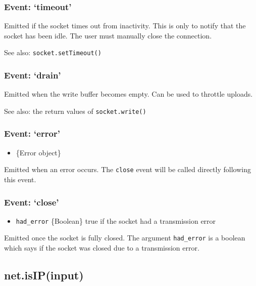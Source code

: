 \subsubsection{\texorpdfstring{Event:
`timeout'}{Event: timeout}}\label{event-timeout}

Emitted if the socket times out from inactivity. This is only to notify
that the socket has been idle. The user must manually close the
connection.

See also: \texttt{socket.setTimeout()}

\subsubsection{\texorpdfstring{Event:
`drain'}{Event: drain}}\label{event-drain}

Emitted when the write buffer becomes empty. Can be used to throttle
uploads.

See also: the return values of \texttt{socket.write()}

\subsubsection{\texorpdfstring{Event:
`error'}{Event: error}}\label{event-error-1}

\begin{itemize}
\itemsep1pt\parskip0pt
\item
  \{Error object\}
\end{itemize}

Emitted when an error occurs. The
\texttt{\textquotesingle{}close\textquotesingle{}} event will be called
directly following this event.

\subsubsection{\texorpdfstring{Event:
`close'}{Event: close}}\label{event-close-1}

\begin{itemize}
\itemsep1pt\parskip0pt
\item
  \texttt{had\_error} \{Boolean\} true if the socket had a transmission
  error
\end{itemize}

Emitted once the socket is fully closed. The argument
\texttt{had\_error} is a boolean which says if the socket was closed due
to a transmission error.

\subsection{net.isIP(input)}\label{net.isipinput}

